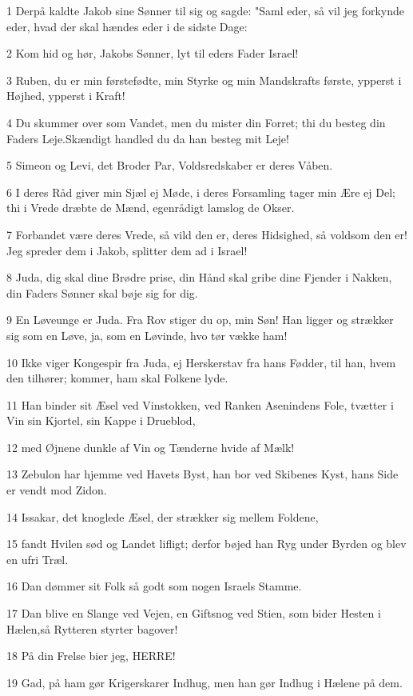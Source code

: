 \par 1 Derpå kaldte Jakob sine Sønner til sig og sagde: "Saml eder, så vil jeg forkynde eder, hvad der skal hændes eder i de sidste Dage:
\par 2 Kom hid og hør, Jakobs Sønner, lyt til eders Fader Israel!
\par 3 Ruben, du er min førstefødte, min Styrke og min Mandskrafts første, ypperst i Højhed, ypperst i Kraft!
\par 4 Du skummer over som Vandet, men du mister din Forret; thi du besteg din Faders Leje.Skændigt handled du da han besteg mit Leje!
\par 5 Simeon og Levi, det Broder Par, Voldsredskaber er deres Våben.
\par 6 I deres Råd giver min Sjæl ej Møde, i deres Forsamling tager min Ære ej Del; thi i Vrede dræbte de Mænd, egenrådigt lamslog de Okser.
\par 7 Forbandet være deres Vrede, så vild den er, deres Hidsighed, så voldsom den er! Jeg spreder dem i Jakob, splitter dem ad i Israel!
\par 8 Juda, dig skal dine Brødre prise, din Hånd skal gribe dine Fjender i Nakken, din Faders Sønner skal bøje sig for dig.
\par 9 En Løveunge er Juda. Fra Rov stiger du op, min Søn! Han ligger og strækker sig som en Løve, ja, som en Løvinde, hvo tør vække ham!
\par 10 Ikke viger Kongespir fra Juda, ej Herskerstav fra hans Fødder, til han, hvem den tilhører; kommer, ham skal Folkene lyde.
\par 11 Han binder sit Æsel ved Vinstokken, ved Ranken Asenindens Fole, tvætter i Vin sin Kjortel, sin Kappe i Drueblod,
\par 12 med Øjnene dunkle af Vin og Tænderne hvide af Mælk!
\par 13 Zebulon har hjemme ved Havets Byst, han bor ved Skibenes Kyst, hans Side er vendt mod Zidon.
\par 14 Issakar, det knoglede Æsel, der strækker sig mellem Foldene,
\par 15 fandt Hvilen sød og Landet lifligt; derfor bøjed han Ryg under Byrden og blev en ufri Træl.
\par 16 Dan dømmer sit Folk så godt som nogen Israels Stamme.
\par 17 Dan blive en Slange ved Vejen, en Giftsnog ved Stien, som bider Hesten i Hælen,så Rytteren styrter bagover!
\par 18 På din Frelse bier jeg, HERRE!
\par 19 Gad, på ham gør Krigerskarer Indhug, men han gør Indhug i Hælene på dem.
